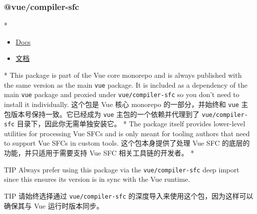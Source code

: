 \begin{paracol}{2}
\subsubsection{@vue/compiler-sfc}
\switchcolumn[0]*%
\begin{itemize}
\item
  \href{https://github.com/vuejs/core/tree/main/packages/compiler-sfc}{Docs}
\end{itemize}
\switchcolumn
\begin{itemize}
\item
  \href{https://github.com/vuejs/core/tree/main/packages/compiler-sfc}{文档}
\end{itemize}
\switchcolumn[0]*%
This package is part of the Vue core monorepo and is always published
with the same version as the main \texttt{vue} package. It is included
as a dependency of the main \texttt{vue} package and proxied under
\texttt{vue/compiler-sfc} so you don't need to install it individually.
\switchcolumn
这个包是 Vue 核心 monorepo 的一部分，并始终和 \texttt{vue}
主包版本号保持一致。它已经成为 \texttt{vue} 主包的一个依赖并代理到了
\texttt{vue/compiler-sfc} 目录下，因此你无需单独安装它。
\switchcolumn[0]*%
The package itself provides lower-level utilities for processing Vue
SFCs and is only meant for tooling authors that need to support Vue SFCs
in custom tools.
\switchcolumn
这个包本身提供了处理 Vue SFC 的底层的功能，并只适用于需要支持 Vue SFC
相关工具链的开发者。
\switchcolumn[0]*%
\begin{vueQuote}{TIP}
Always prefer using this package via the \texttt{vue/compiler-sfc} deep
import since this ensures its version is in sync with the Vue runtime.
\end{vueQuote} 
\switchcolumn
\begin{vueQuote}{TIP}
请始终选择通过 \texttt{vue/compiler-sfc}
的深度导入来使用这个包，因为这样可以确保其与 Vue 运行时版本同步。
\end{vueQuote} 
\end{paracol}

